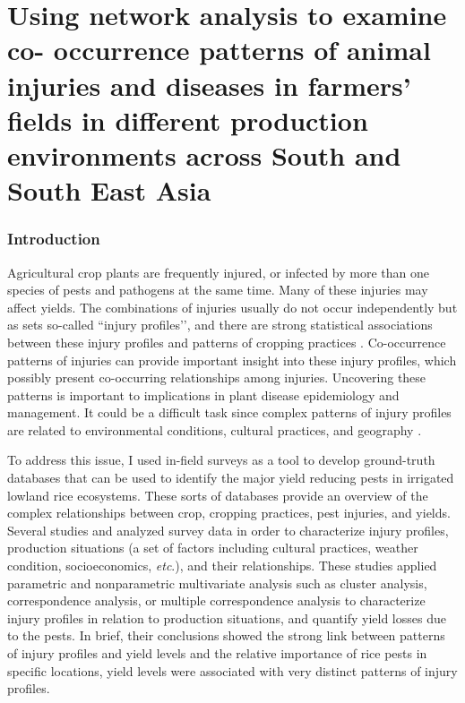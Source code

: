 \chapter{Using network analysis to examine co- occurrence patterns of animal injuries and diseases in farmers' fields in different production environments across South and South East Asia}

\subsection{Introduction}

Agricultural crop plants are frequently injured, or infected by more than one species of pests and pathogens at the same time. Many of these injuries may affect yields. The combinations of injuries usually do not occur independently but as sets so-called ``injury profiles’’, and there are strong statistical associations between these injury profiles and patterns of cropping practices \citep{Savary_2006_Quantification}. Co-occurrence patterns of injuries can provide important insight into these injury profiles, which possibly present co-occurring relationships among injuries. Uncovering these patterns is important to implications in plant disease epidemiology and management. It could be a difficult task since complex patterns of injury profiles are related to environmental conditions, cultural practices, and geography \citep{Willocquet_2008_Simulating}. 

To address this issue, I used in-field surveys as a tool to develop ground-truth databases that can be used to identify the major yield reducing pests in irrigated lowland rice ecosystems. These sorts of databases provide an overview of the complex relationships between crop, cropping practices, pest injuries, and yields. Several studies \citet{Savary_2000_Quantification, Savary_2000_Characterization, Dong_2010_Characterization} and \citet{Reddy_2011_Characterizing} analyzed survey data in order to characterize injury profiles, production situations (a set of factors including cultural practices, weather condition, socioeconomics, \textit{etc}.), and their relationships. These studies applied parametric and nonparametric multivariate analysis such as cluster analysis, correspondence analysis, or multiple correspondence analysis to characterize injury profiles in relation to production situations, and quantify yield losses due to the pests. In brief, their conclusions showed the strong link between patterns of injury profiles and yield levels and the relative importance of rice pests in specific locations, yield levels were associated with very distinct patterns of injury profiles.

